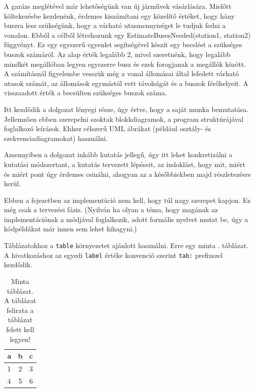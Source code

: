A garázs meglétével már lehetőségünk van új járművek vásárlására. Mielőtt költekezésbe kezdenénk, érdemes kiszámítani egy közelítő értéket, hogy hány buszra lesz szükségünk, hogy a várható utasmennyiséget le tudjuk fedni a vonalon. Ebből a célből létrehozunk egy EstimateBusesNeeded(station1, station2) függvényt. Ez egy egyszerű egyenlet segítségével készít egy becslést a szükséges buszok számáról. Az alap érték legalább 2, mivel szeretnénk, hogy legalább mindkét megállóban legyen egyszerre busz és ezek forogjanak a megállók között.
A számításnál figyelembe vesszük még a vonal állomásai által lefedett várható utasok számát, az állomások egymástól vett távolságát és a buszok férőhelyeit. A visszaadott érték a becsülten szükséges buszok száma.





\Section{}

Itt kezdődik a dolgozat lényegi része, úgy értve, hogy a saját munka bemutatása.
Jellemzően ebben szerepelni szoktak blokkdiagramok, a program struktúrájával foglalkozó leírások.
Ehhez célszerű UML ábrákat (például osztály- és szekvenciadiagramokat) használni.

Amennyiben a dolgozat inkább kutatás jellegű, úgy itt lehet konkretizálni a kutatási módszertant, a kutatás tervezett lépéseit, az indoklást, hogy mit, miért és miért pont úgy érdemes csinálni, ahogyan az a későbbiekben majd részletezésre kerül.

Ebben a fejezetben az implementáció nem kell, hogy túl nagy szerepet kapjon.
Ez még csak a tervezési fázis.
(Nyilván ha olyan a téma, hogy magának az implementációnak a módjával foglalkozik, adott formális nyelvet mutat be, úgy a kódpéldákat már innen sem lehet kihagyni.)


Táblázatokhoz a \texttt{table} környezetet ajánlott használni.
Erre egy minta . táblázat.
A hivatkozáshoz az egyedi \texttt{label} értéke konvenció szerint \texttt{tab:} prefixszel kezdődik.

\begin{table}[h]
\centering
\caption{Minta táblázat. A táblázat felirata a táblázat felett kell legyen!}
\label{tab:minta}
\begin{tabular}{l|c|c|}
a & b & c \\
\hline
1 & 2 & 3 \\
4 & 5 & 6 \\
\hline
\end{tabular}
\end{table}

